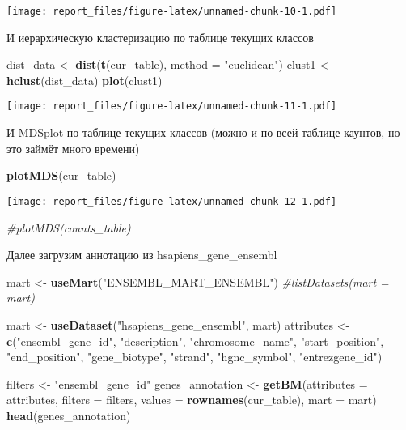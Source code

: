 \documentclass[
]{article}
\newenvironment{Shaded}{\begin{snugshade}}{\end{snugshade}}
\newcommand{\CommentTok}[1]{\textcolor[rgb]{0.56,0.35,0.01}{\textit{#1}}}
\newcommand{\DataTypeTok}[1]{\textcolor[rgb]{0.13,0.29,0.53}{#1}}
\newcommand{\KeywordTok}[1]{\textcolor[rgb]{0.13,0.29,0.53}{\textbf{#1}}}
\newcommand{\NormalTok}[1]{#1}
\newcommand{\StringTok}[1]{\textcolor[rgb]{0.31,0.60,0.02}{#1}}
\begin{document}
\texttt{[image: report\_files/figure-latex/unnamed-chunk-10-1.pdf]}

И иерархическую кластеризацию по таблице текущих классов

\begin{Shaded}
\begin{Highlighting}[]
\NormalTok{dist_data <-}\StringTok{ }\KeywordTok{dist}\NormalTok{(}\KeywordTok{t}\NormalTok{(cur_table), }\DataTypeTok{method =} \StringTok{"euclidean"}\NormalTok{)}
\NormalTok{clust1 <-}\KeywordTok{hclust}\NormalTok{(dist_data)}
\KeywordTok{plot}\NormalTok{(clust1)}
\end{Highlighting}
\end{Shaded}

\texttt{[image: report\_files/figure-latex/unnamed-chunk-11-1.pdf]}

И MDSplot по таблице текущих классов (можно и по всей таблице каунтов,
но это займёт много времени)

\begin{Shaded}
\begin{Highlighting}[]
\KeywordTok{plotMDS}\NormalTok{(cur_table)}
\end{Highlighting}
\end{Shaded}

\texttt{[image: report\_files/figure-latex/unnamed-chunk-12-1.pdf]}

\begin{Shaded}
\begin{Highlighting}[]
\CommentTok{#plotMDS(counts_table)}
\end{Highlighting}
\end{Shaded}

Далее загрузим аннотацию из hsapiens\_gene\_ensembl

\begin{Shaded}
\begin{Highlighting}[]
\NormalTok{mart <-}\StringTok{ }\KeywordTok{useMart}\NormalTok{(}\StringTok{"ENSEMBL_MART_ENSEMBL"}\NormalTok{)}
\CommentTok{#listDatasets(mart = mart)}

\NormalTok{mart <-}\StringTok{ }\KeywordTok{useDataset}\NormalTok{(}\StringTok{"hsapiens_gene_ensembl"}\NormalTok{, mart)}
\NormalTok{attributes <-}\StringTok{ }\KeywordTok{c}\NormalTok{(}\StringTok{"ensembl_gene_id"}\NormalTok{, }\StringTok{"description"}\NormalTok{, }\StringTok{"chromosome_name"}\NormalTok{,}
                \StringTok{"start_position"}\NormalTok{, }\StringTok{"end_position"}\NormalTok{, }\StringTok{"gene_biotype"}\NormalTok{,}
                \StringTok{"strand"}\NormalTok{, }\StringTok{"hgnc_symbol"}\NormalTok{, }\StringTok{"entrezgene_id"}\NormalTok{)}

\NormalTok{filters <-}\StringTok{ "ensembl_gene_id"}
\NormalTok{genes_annotation <-}\StringTok{ }\KeywordTok{getBM}\NormalTok{(}\DataTypeTok{attributes =}\NormalTok{ attributes, }\DataTypeTok{filters =}\NormalTok{ filters, }\DataTypeTok{values =} \KeywordTok{rownames}\NormalTok{(cur_table), }\DataTypeTok{mart =}\NormalTok{ mart)}
\KeywordTok{head}\NormalTok{(genes_annotation)}
\end{Highlighting}
\end{Shaded}
\end{document}
